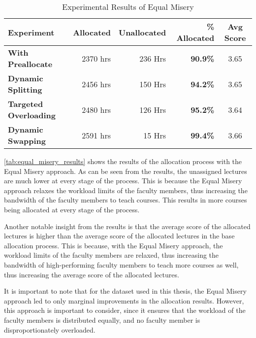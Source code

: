 \begin{table}[H]
  \centering
  \begin{tabular}{|l|r|r|r|c|}
    \hline
    \textbf{Experiment}           & \textbf{Allocated} & \textbf{Unallocated} & \textbf{\% Allocated} & \textbf{Avg Score} \\ \hline
    \textbf{With Preallocate}     & 2370 hrs           & 236 Hrs              & \textbf{90.9\%}       & 3.65               \\ \hline
    \textbf{Dynamic Splitting}    & 2456 hrs           & 150 Hrs              & \textbf{94.2\%}       & 3.65               \\ \hline
    \textbf{Targeted Overloading} & 2480 hrs           & 126 Hrs              & \textbf{95.2\%}       & 3.64               \\ \hline
    \textbf{Dynamic Swapping}     & 2591 hrs           & 15 Hrs               & \textbf{99.4\%}       & 3.66               \\ \hline
  \end{tabular}
  \caption{Experimental Results of Equal Misery}
  \label{tab:equal_misery_results}
\end{table}

\autoref{tab:equal_misery_results} shows the results of the allocation process with the Equal Misery approach. As can be seen from the results, the unassigned lectures are much lower at every stage of the process. This is because the Equal Misery approach relaxes the workload limits of the faculty members, thus increasing the bandwidth of the faculty members to teach courses. This results in more courses being allocated at every stage of the process.

Another notable insight from the results is that the average score of the allocated lectures is higher than the average score of the allocated lectures in the base allocation process. This is because, with the Equal Misery approach, the workload limits of the faculty members are relaxed, thus increasing the bandwidth of high-performing faculty members to teach more courses as well, thus increasing the average score of the allocated lectures.

It is important to note that for the dataset used in this thesis, the Equal Misery approach led to only marginal improvements in the allocation results. However, this approach is important to consider, since it ensures that the workload of the faculty members is distributed equally, and no faculty member is disproportionately overloaded.

